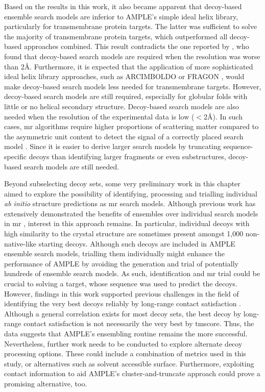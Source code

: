 Based on the results in this work, it also became apparent that decoy-based ensemble search models are inferior to AMPLE's simple ideal helix library, particularly for transmembrane protein targets. The latter was sufficient to solve the majority of transmembrane protein targets, which outperformed all decoy-based approaches combined. This result contradicts the one reported by \textcite{Thomas2017-sh}, who found that decoy-based search models are required when the resolution was worse than 2\AA. Furthermore, it is expected that the application of more sophisticated ideal helix library approaches, such as ARCIMBOLDO \cite{Millan2015-uf} or FRAGON \cite{Jenkins2018-gf}, would make decoy-based search models less needed for transmembrane targets. However, decoy-based search models are still required, especially for globular folds with little or no helical secondary structure. Decoy-based search models are also needed when the resolution of the experimental data is low ($<2$\AA). In such cases, \gls{mr} algorithms require higher proportions of scattering matter compared to the asymmetric unit content to detect the signal of a correctly placed search model \cite{McCoy2017-cz}. Since it is easier to derive larger search models by truncating sequence-specific decoys than identifying larger fragments or even substructures, decoy-based search models are still needed.

Beyond subselecting decoy sets, some very preliminary work in this chapter aimed to explore the possibility of identifying, processing and trialling individual \textit{ab initio} structure predictions as \gls{mr} search models. Although previous work has extensively demonstrated the benefits of ensembles over individual search models in \gls{mr} \cite{Rigden2018-zt,Keegan2018-kn,Thomas2015-wu}, interest in this approach remains. In particular, individual decoys with high similarity to the crystal structure are sometimes present amongst 1,000 non-native-like starting decoys. Although such decoys are included in AMPLE ensemble search models, trialling them individually might enhance the performance of AMPLE by avoiding the generation and trial of potentially hundreds of ensemble search models. As such, identification and \gls{mr} trial could be crucial to solving a target, whose sequence was used to predict the decoys. However, findings in this work supported previous challenges in the field of identifying the very best decoys reliably by long-range contact satisfaction \cite{Adhikari2018-lj,De_Oliveira2016-gj,Kosciolek2014-bt}. Although a general correlation exists for most decoy sets, the best decoy by long-range contact satisfaction is not necessarily the very best by \gls{tmscore}. Thus, the data suggests that AMPLE's ensembling routine remains the more successful. Nevertheless, further work needs to be conducted to explore alternate decoy processing options. These could include a combination of metrics used in this study, or alternatives such as solvent accessible surface. Furthermore, exploiting contact information to aid AMPLE's cluster-and-truncate approach could prove a promising alternative, too.
